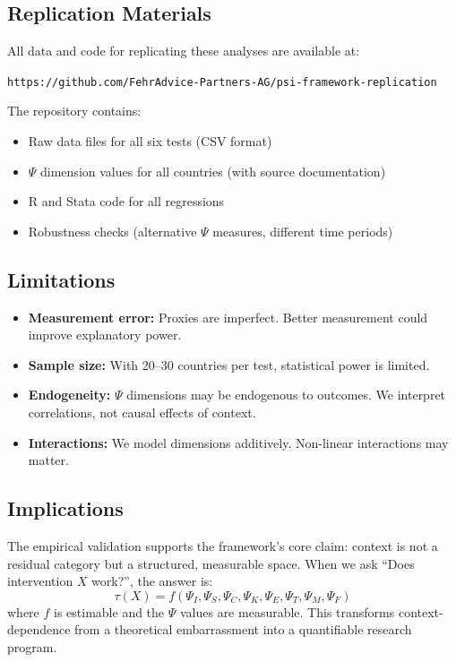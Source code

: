\subsection{Replication Materials}

All data and code for replicating these analyses are available at:

\begin{center}
\texttt{https://github.com/FehrAdvice-Partners-AG/psi-framework-replication}
\end{center}

The repository contains:
\begin{itemize}
    \item Raw data files for all six tests (CSV format)
    \item $\Psi$ dimension values for all countries (with source documentation)
    \item R and Stata code for all regressions
    \item Robustness checks (alternative $\Psi$ measures, different time periods)
\end{itemize}

\subsection{Limitations}

\begin{itemize}
    \item \textbf{Measurement error:} Proxies are imperfect. Better measurement could improve explanatory power.
    \item \textbf{Sample size:} With 20--30 countries per test, statistical power is limited.
    \item \textbf{Endogeneity:} $\Psi$ dimensions may be endogenous to outcomes. We interpret correlations, not causal effects of context.
    \item \textbf{Interactions:} We model dimensions additively. Non-linear interactions may matter.
\end{itemize}

\subsection{Implications}

The empirical validation supports the framework's core claim: context is not a residual category but a structured, measurable space. When we ask ``Does intervention $X$ work?'', the answer is:
\begin{equation}
\tau(X) = f(\Psi_I, \Psi_S, \Psi_C, \Psi_K, \Psi_E, \Psi_T, \Psi_M, \Psi_F)
\label{eq:treatment-context-appv}
\end{equation}
where $f$ is estimable and the $\Psi$ values are measurable. This transforms context-dependence from a theoretical embarrassment into a quantifiable research program.


